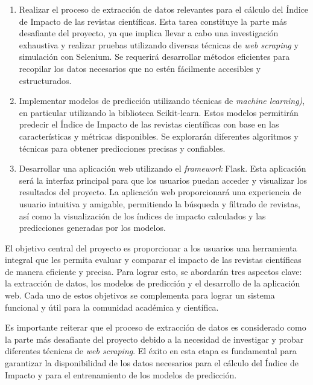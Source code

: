 \begin{enumerate}
    \item Realizar el proceso de extracción de datos relevantes para el cálculo del Índice de Impacto de las revistas científicas. Esta tarea constituye la parte más desafiante del proyecto, ya que implica llevar a cabo una investigación exhaustiva y realizar pruebas utilizando diversas técnicas de \textit{web scraping} y simulación con Selenium. Se requerirá desarrollar métodos eficientes para recopilar los datos necesarios que no estén fácilmente accesibles y estructurados.
    
    \item Implementar modelos de predicción utilizando técnicas de \textit{machine learning)}, en particular utilizando la biblioteca Scikit-learn. Estos modelos permitirán predecir el Índice de Impacto de las revistas científicas con base en las características y métricas disponibles. Se explorarán diferentes algoritmos y técnicas para obtener predicciones precisas y confiables.
    
    \item Desarrollar una aplicación web utilizando el \textit{framework} Flask. Esta aplicación será la interfaz principal para que los usuarios puedan acceder y visualizar los resultados del proyecto. La aplicación web proporcionará una experiencia de usuario intuitiva y amigable, permitiendo la búsqueda y filtrado de revistas, así como la visualización de los índices de impacto calculados y las predicciones generadas por los modelos.
\end{enumerate}

El objetivo central del proyecto es proporcionar a los usuarios una herramienta integral que les permita evaluar y comparar el impacto de las revistas científicas de manera eficiente y precisa. Para lograr esto, se abordarán tres aspectos clave: la extracción de datos, los modelos de predicción y el desarrollo de la aplicación web. Cada uno de estos objetivos se complementa para lograr un sistema funcional y útil para la comunidad académica y científica.

Es importante reiterar que el proceso de extracción de datos es considerado como la parte más desafiante del proyecto debido a la necesidad de investigar y probar diferentes técnicas de \textit{web scraping}. El éxito en esta etapa es fundamental para garantizar la disponibilidad de los datos necesarios para el cálculo del Índice de Impacto y para el entrenamiento de los modelos de predicción.


